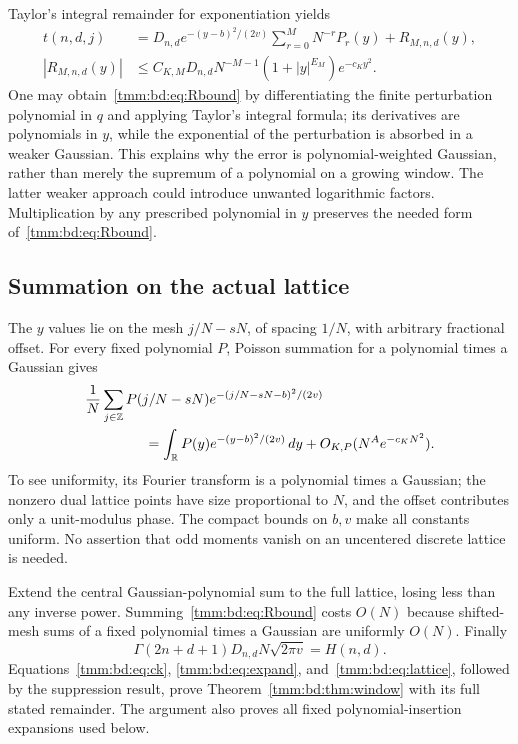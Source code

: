 \documentclass[11pt,letterpaper]{article}
\theoremstyle{remark}\newtheorem{remark}[theorem]{Remark}
\begin{document}
Taylor's integral remainder for exponentiation yields
\begin{align}
 t(n,d,j)&=D_{n,d}e^{-(y-b)^2/(2v)}
              \sum_{r=0}^MN^{-r}P_r(y)+R_{M,n,d}(y),\label{tmm:bd:eq:expand}\\
 |R_{M,n,d}(y)|&\le C_{K,M}D_{n,d}N^{-M-1}
                      (1+|y|^{E_M})e^{-c_Ky^2}.\label{tmm:bd:eq:Rbound}
\end{align}
One may obtain~\eqref{tmm:bd:eq:Rbound} by differentiating the finite perturbation polynomial in $q$ and applying Taylor's integral formula; its derivatives are polynomials in $y$, while the exponential of the perturbation is absorbed in a weaker Gaussian. This explains why the error is polynomial-weighted Gaussian, rather than merely the supremum of a polynomial on a growing window. The latter weaker approach could introduce unwanted logarithmic factors. Multiplication by any prescribed polynomial in $y$ preserves the needed form of~\eqref{tmm:bd:eq:Rbound}.

\subsection{Summation on the actual lattice}
The $y$ values lie on the mesh $j/N-sN$, of spacing $1/N$, with arbitrary fractional offset. For every fixed polynomial $P$, Poisson summation for a polynomial times a Gaussian gives
\begin{align}
 &\frac1N\sum_{j\in\mathbb Z}P(j/N-sN)
     e^{-(j/N-sN-b)^2/(2v)}\notag\\
 &\hspace{15mm}=\int_{\mathbb R}P(y)e^{-(y-b)^2/(2v)}\,dy
                   +O_{K,P}(N^A e^{-c_KN^2}).\label{tmm:bd:eq:lattice}
\end{align}
To see uniformity, its Fourier transform is a polynomial times a Gaussian; the nonzero dual lattice points have size proportional to $N$, and the offset contributes only a unit-modulus phase. The compact bounds on $b,v$ make all constants uniform. No assertion that odd moments vanish on an uncentered discrete lattice is needed.

Extend the central Gaussian-polynomial sum to the full lattice, losing less than any inverse power. Summing~\eqref{tmm:bd:eq:Rbound} costs $O(N)$ because shifted-mesh sums of a fixed polynomial times a Gaussian are uniformly $O(N)$. Finally
\[
 \Gamma(2n+d+1)D_{n,d}N\sqrt{2\pi v}=H(n,d).
\]
Equations~\eqref{tmm:bd:eq:ck}, \eqref{tmm:bd:eq:expand}, and~\eqref{tmm:bd:eq:lattice}, followed by the suppression result, prove Theorem~\ref{tmm:bd:thm:window} with its full stated remainder. The argument also proves all fixed polynomial-insertion expansions used below.
\end{document}
